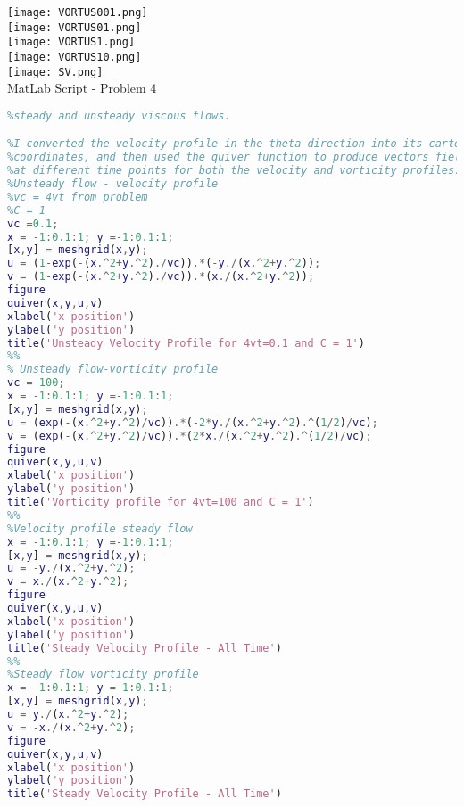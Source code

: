 \documentclass{article}
\begin{document}
 \texttt{[image: VORTUS001.png]}\\
 \texttt{[image: VORTUS01.png]}\\
 \texttt{[image: VORTUS1.png]}\\
 \texttt{[image: VORTUS10.png]}\\
 \texttt{[image: SV.png]}\\
MatLab Script - Problem 4
\begin{lstlisting}[language = Matlab]
%Creating a vorticity and velocity profile at different time steps for both
%steady and unsteady viscous flows.

%I converted the velocity profile in the theta direction into its cartesian
%coordinates, and then used the quiver function to produce vectors fields
%at different time points for both the velocity and vorticity profiles.
%Unsteady flow - velocity profile
%vc = 4vt from problem
%C = 1
vc =0.1;
x = -1:0.1:1; y =-1:0.1:1;
[x,y] = meshgrid(x,y);
u = (1-exp(-(x.^2+y.^2)./vc)).*(-y./(x.^2+y.^2));
v = (1-exp(-(x.^2+y.^2)./vc)).*(x./(x.^2+y.^2));
figure
quiver(x,y,u,v)
xlabel('x position')
ylabel('y position')
title('Unsteady Velocity Profile for 4vt=0.1 and C = 1')
%%
% Unsteady flow-vorticity profile
vc = 100;
x = -1:0.1:1; y =-1:0.1:1;
[x,y] = meshgrid(x,y);
u = (exp(-(x.^2+y.^2)/vc)).*(-2*y./(x.^2+y.^2).^(1/2)/vc);
v = (exp(-(x.^2+y.^2)/vc)).*(2*x./(x.^2+y.^2).^(1/2)/vc);
figure
quiver(x,y,u,v)
xlabel('x position')
ylabel('y position')
title('Vorticity profile for 4vt=100 and C = 1')
%%
%Velocity profile steady flow
x = -1:0.1:1; y =-1:0.1:1;
[x,y] = meshgrid(x,y);
u = -y./(x.^2+y.^2);
v = x./(x.^2+y.^2);
figure
quiver(x,y,u,v)
xlabel('x position')
ylabel('y position')
title('Steady Velocity Profile - All Time')
%%
%Steady flow vorticity profile
x = -1:0.1:1; y =-1:0.1:1;
[x,y] = meshgrid(x,y);
u = y./(x.^2+y.^2);
v = -x./(x.^2+y.^2);
figure
quiver(x,y,u,v)
xlabel('x position')
ylabel('y position')
title('Steady Velocity Profile - All Time')
\end{lstlisting}
\end{document}
